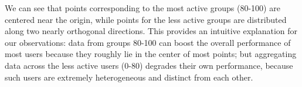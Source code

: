 We can see that points corresponding to the most active groups (80-100) are centered near the origin, while points for the less active groups are distributed along two nearly orthogonal directions. This provides an intuitive explanation for our observations: data from groups 80-100 can boost the overall performance of most users because they roughly lie in the center of most points; but aggregating data across the less active users (0-80) degrades their own performance, because such users are extremely heterogeneous and distinct from each other.


